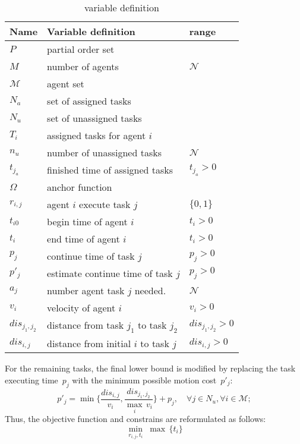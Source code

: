 \begin{table}[t]
	\begin{tabular}{|l|p{}|p{}|}\hline
		Name & Variable definition & range \\\hline
		$P$ & partial order set& \\
		$M$  & number of agents & $\mathcal{N}$\\
		$\mathcal{M}$  & agent set & \\
		$N_a$ & set of assigned tasks &  \\
		$N_u$ & set of unassigned tasks &  \\
		$T_i$ & assigned tasks for agent $i$ &  \\
		$n_u$ & number of unassigned tasks & $\mathcal{N}$ \\
		$t_{j_a}$ & finished time of assigned tasks & $t_{j_a}>0$\\
		$\Omega$ & anchor function &\\
		$r_{i,j}$ & agent $i$ execute task $j$ & $\{0,1\}$\\
		$t_{i0}$ & begin time of agent $i$ & $t_i>0$ \\
		$t_i$ & end time of agent $i$ & $t_i>0$ \\
		$p_j$ & continue time of task $j$ & $p_j >0$\\
		$p'_j$ & estimate continue time of task $j$ & $p_j >0$\\
		$a_{j}$ & number agent task $j$ needed. & $\mathcal{N}$\\
		$v_i$ & velocity of agent $i$ &   $v_i>0$\\
		$dis_{j_1,j_2}$ & distance from task $j_1$ to task $j_2$ &  $dis_{j_1,j_2}>0$\\
		$dis_{i,j}$ & distance from initial $i$ to task $j$ & $dis_{i,j}>0$\\\hline
	\end{tabular}
	\centering
	\caption{variable definition}
	\label{tab:variables2}
\end{table}
For the remaining tasks, the final lower bound is modified by replacing the
task executing time~$p_j$ with the minimum possible motion cost~$p'_j$:
\begin{equation}
  p'_j = \min{\{\frac{dis_{i,j}}{v_i}, \frac{dis_{j_1,j_2}}{\max_i\, {v_i}}\}}+p_j,
  \quad \forall j\in N_u, \forall i \in \mathcal{M};
\label{13}
\end{equation}
Thus, the objective function and constrains are reformulated as follows:
\begin{equation}
\min_{r_{i,j},t_i} \;\max\, \{t_i\}
\label{14}
\end{equation}

